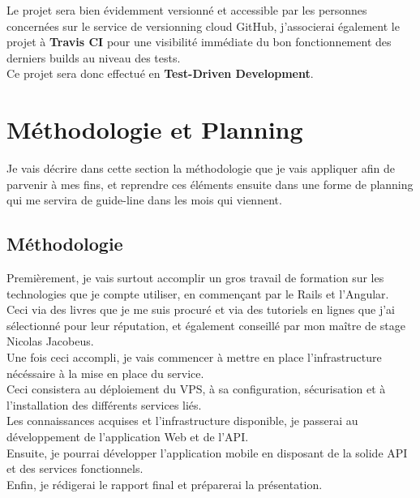 \documentclass{report}
\begin{document}
		Le projet sera bien évidemment versionné et accessible par les personnes concernées sur le service de versionning cloud GitHub, j'associerai également le projet à \textbf{Travis CI} pour une visibilité immédiate du bon fonctionnement des derniers builds au niveau des tests.\\

		Ce projet sera donc effectué en \textbf{Test-Driven Development}.\\

\section{Méthodologie et Planning}

	Je vais décrire dans cette section la méthodologie que je vais appliquer afin de parvenir à mes fins, et reprendre ces éléments ensuite dans une forme de planning qui me servira de guide-line dans les mois qui viennent.\\

	\subsection{Méthodologie}

		Premièrement, je vais surtout accomplir un gros travail de formation sur les technologies que je compte utiliser, en commençant par le Rails et l'Angular.\\
		Ceci via des livres que je me suis procuré et via des tutoriels en lignes que j'ai sélectionné pour leur réputation, et également conseillé par mon maître de stage Nicolas Jacobeus.\\

		Une fois ceci accompli, je vais commencer à mettre en place l'infrastructure nécéssaire à la mise en place du service.\\
		Ceci consistera au déploiement du VPS, à sa configuration, sécurisation et à l'installation des différents services liés.\\

		Les connaissances acquises et l'infrastructure disponible, je passerai au développement de l'application Web et de l'API.\\

		Ensuite, je pourrai développer l'application mobile en disposant de la solide API et des services fonctionnels.\\

		Enfin, je rédigerai le rapport final et préparerai la présentation.\\
\end{document}
